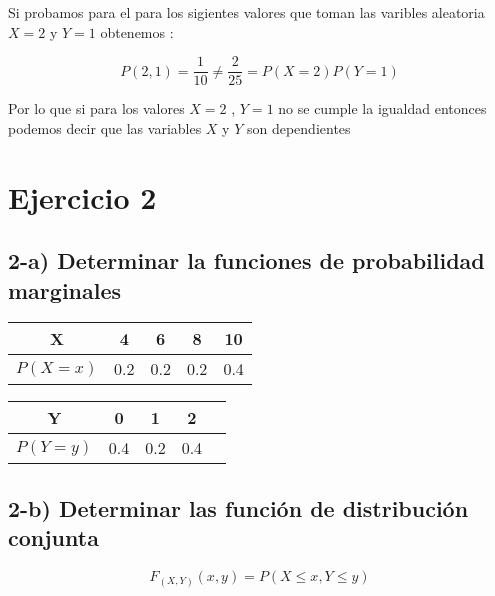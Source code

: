 \documentclass[12pt]{article}
\begin{document}
\begin{flushleft}
    Si probamos para el para los sigientes valores que toman las varibles aleatoria  $X = 2$ y $Y=1 $ obtenemos : 
\end{flushleft}
\begin{equation*}
    P\left(2,1\right)  =  \frac{1}{10} \neq \frac{2}{25}   = P\left(X=2\right) P\left(Y=1\right)
\end{equation*} 
  
\begin{flushleft}
    Por lo que si para los valores $ X = 2 $ , $ Y = 1 $ no se cumple la igualdad entonces podemos decir que las variables 
    $X$ y $Y$ son dependientes 
\end{flushleft}


\section*{Ejercicio 2}

\subsection*{2-a)  Determinar la funciones de probabilidad marginales }

\begin{center}
    \begin{tabular}{|c|c|c|c|c|}
        \hline
        X                   & 4   & 6   & 8   & 10
        \\\hline
        $P\left(X=x\right)$ & 0.2 & 0.2 & 0.2 & 0.4
        \\
        \hline
    \end{tabular}

    \vspace*{0.5cm}
    \begin{tabular}{|c|c|c|c|c|}
        \hline
        Y                   & 0   & 1   & 2
        \\\hline
        $P\left(Y=y\right)$ & 0.4 & 0.2 & 0.4
        \\
        \hline
    \end{tabular}
\end{center}

\subsection*{2-b)  Determinar las funci\'on de distribuci\'on conjunta}

\begin{equation*}
    F_{\left(X,Y\right)} \left(x,y\right) = P \left(X \le x , Y \le y\right)
\end{equation*}
\end{document}

